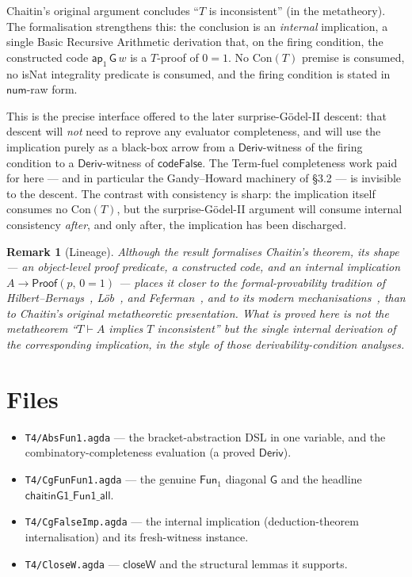\documentclass[11pt]{article}
\newtheorem{remark}{Remark}
\newcommand{\Deriv}{\mathsf{Deriv}}
\newcommand{\closeW}{\mathsf{closeW}}
\newcommand{\codeFalse}{\mathsf{codeFalse}}
\newcommand{\num}{\mathsf{num}}
\newcommand{\ap}[1]{\mathsf{ap}_{#1}}
\newcommand{\Fun}[1]{\mathsf{Fun}_{#1}}
\newcommand{\GG}{\mathsf{G}}
\begin{document}
Chaitin's original argument concludes ``$T$ is inconsistent'' (in the
metatheory). The formalisation strengthens this: the conclusion is
an \emph{internal} implication, a single Basic Recursive Arithmetic derivation that, on the
firing condition, the constructed code $\ap{1}\,\GG\,w$ is a $T$-proof
of $0=1$. No $\mathrm{Con}(T)$ premise is consumed, no \textsf{isNat}
integrality predicate is consumed, and the firing condition is stated
in $\num$-raw form.

This is the precise interface offered to the later surprise-G\"odel-II
descent: that descent will \emph{not} need to reprove any evaluator
completeness, and will use the implication purely as a black-box arrow
from a $\Deriv$-witness of the firing condition to a $\Deriv$-witness of
$\codeFalse$. The Term-fuel completeness work paid for here --- and in
particular the Gandy--Howard machinery of \S3.2 --- is invisible to the
descent. The contrast with consistency is sharp: the implication itself
consumes no $\mathrm{Con}(T)$, but the surprise-G\"odel-II argument will
consume internal consistency \emph{after}, and only after, the
implication has been discharged.

\begin{remark}[Lineage]
Although the result formalises Chaitin's theorem, its \emph{shape} ---
an object-level proof predicate, a constructed code, and an internal
implication $A \to \mathsf{Proof}(p,\,0=1)$ --- places it closer to the
formal-provability tradition of Hilbert--Bernays~\cite{HilbertBernays},
L\"ob~\cite{Loeb}, and Feferman~\cite{Feferman}, and to its modern
mechanisations~\cite{Paulson}, than to Chaitin's original metatheoretic
presentation. What is proved here is not the metatheorem ``$T \vdash A$
implies $T$ inconsistent'' but the single internal derivation of the
corresponding implication, in the style of those derivability-condition
analyses.
\end{remark}

\section{Files}

\begin{itemize}
\item \texttt{T4/AbsFun1.agda} --- the bracket-abstraction DSL in one
  variable, and the combinatory-completeness evaluation (a proved $\Deriv$).
\item \texttt{T4/CgFunFun1.agda} --- the genuine $\Fun{1}$ diagonal
  $\GG$ and the headline $\textsf{chaitinG1\_Fun1\_all}$.
\item \texttt{T4/CgFalseImp.agda} --- the internal implication
  (deduction-theorem internalisation) and its fresh-witness instance.
\item \texttt{T4/CloseW.agda} --- $\closeW$ and the structural lemmas
  it supports.
\end{itemize}
\end{document}
